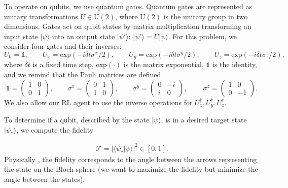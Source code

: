 To operate on qubits, we use quantum gates. Quantum gates are represented as unitary transformations $U\in \mathrm{U(2)}$, where $\mathrm{U(2)}$ is the unitary group in two dimensions. Gates act on qubit states by matrix multiplication transforming an input state $|\psi\rangle$ into an output state $|\psi'\rangle$: $|\psi'\rangle=U|\psi\rangle$. For this problem, we consider four gates and their inverses:
\begin{equation}
U_0=\mathds{1},\qquad 
U_x=\mathrm{exp}(-i\delta t \sigma^x/2),\qquad
U_y=\mathrm{exp}(-i\delta t \sigma^y/2),\qquad 
U_z=\mathrm{exp}(-i\delta t \sigma^z/2),
\end{equation}
where $\delta t$ is a fixed time step, $\mathrm{exp}(\cdot)$ is the matrix exponential, 
$\mathds{1}$ is the identity, and we remind that the Pauli matrices are defined
\begin{equation}
\mathds{1}=\begin{pmatrix}
1 & 0 \\ 0 & 1
\end{pmatrix}
,\qquad
\sigma^x=\begin{pmatrix}
0 & 1 \\ 1 & 0
\end{pmatrix}
,\qquad
\sigma^y=\begin{pmatrix}
0 & -i \\ i & 0
\end{pmatrix}
,\ \qquad
\sigma^z=\begin{pmatrix}
1 & 0 \\ 0 & -1
\end{pmatrix}.
\end{equation}
We also allow our RL agent to use the inverse operations for $U_x^\dagger, U_y^\dagger, U_z^\dagger$. 

To determine if a qubit, described by the state $|\psi\rangle$, is in a desired target state $|\psi_\ast\rangle$, we compute the fidelity

\begin{eqnarray}
\mathcal F=|\langle\psi_\ast|\psi\rangle|^2\in[0,1].
\end{eqnarray} 
Physically , the fidelity corresponds to the angle between the arrows representing the state on the Bloch sphere (we want to maximize the fidelity but minimize the angle between the states).


